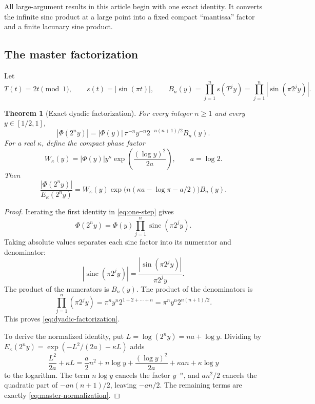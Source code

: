 \documentclass[11pt,oneside]{article}
\numberwithin{equation}{section}
\newtheorem{theorem}{Theorem}[section]
\theoremstyle{definition}
\theoremstyle{remark}
\newcommand{\abs}[1]{\left|#1\right|}
\newcommand{\sinc}{\operatorname{sinc}}
\newcommand{\PhiUp}{\Phi}
\begin{document}
All large-argument results in this article begin with one exact identity.  It converts the
infinite sinc product at a large point into a fixed compact ``mantissa'' factor and a finite
lacunary sine product.

\subsection{The master factorization}

Let
\begin{equation}
 T(t)=2t\pmod1,
 \qquad s(t)=\abs{\sin(\pi t)},
 \qquad
 B_n(y)=\prod_{j=1}^{n}s(T^jy)
       =\prod_{j=1}^{n}\abs{\sin(\pi2^jy)}.
 \label{eq:T-s-B}
\end{equation}

\begin{theorem}[Exact dyadic factorization]
\label{thm:dyadic-factorization}
For every integer \(n\ge1\) and every \(y\in[1/2,1]\),
\begin{equation}
 \boxed{
 \abs{\PhiUp(2^ny)}
 =\abs{\PhiUp(y)}\,\pi^{-n}y^{-n}2^{-n(n+1)/2}B_n(y).}
 \label{eq:dyadic-factorization}
\end{equation}
For a real \(\kappa\), define the compact phase factor
\begin{equation}
 W_\kappa(y)
 =\abs{\PhiUp(y)}y^\kappa
   \exp\!\left(\frac{(\log y)^2}{2a}\right),
 \qquad a=\log2.
 \label{eq:W-kappa}
\end{equation}
Then
\begin{equation}
 \boxed{
 \frac{\abs{\PhiUp(2^ny)}}{E_\kappa(2^ny)}
 =W_\kappa(y)
   \exp\!\bigl(n(\kappa a-\log\pi-a/2)\bigr)B_n(y).}
 \label{eq:master-normalization}
\end{equation}
\end{theorem}

\begin{proof}
Iterating the first identity in \eqref{eq:one-step} gives
\[
 \PhiUp(2^ny)=\PhiUp(y)\prod_{j=1}^{n}\sinc(\pi2^jy).
\]
Taking absolute values separates each sinc factor into its numerator and denominator:
\[
 \left|\sinc(\pi2^jy)\right|
 =\frac{\abs{\sin(\pi2^jy)}}{\pi2^jy}.
\]
The product of the numerators is \(B_n(y)\).  The product of the denominators is
\[
 \prod_{j=1}^{n}(\pi2^jy)
 =\pi^ny^n2^{1+2+\cdots+n}
 =\pi^ny^n2^{n(n+1)/2}.
\]
This proves \eqref{eq:dyadic-factorization}.

To derive the normalized identity, put \(L=\log(2^ny)=na+\log y\).  Dividing by
\(E_\kappa(2^ny)=\exp(-L^2/(2a)-\kappa L)\) adds
\[
 \frac{L^2}{2a}+\kappa L
 =\frac{a}{2}n^2+n\log y+\frac{(\log y)^2}{2a}
   +\kappa an+\kappa\log y
\]
to the logarithm.  The term \(n\log y\) cancels the factor \(y^{-n}\), and
\(an^2/2\) cancels the quadratic part of \(-a n(n+1)/2\), leaving \(-an/2\).
The remaining terms are exactly \eqref{eq:master-normalization}.
\end{proof}
\end{document}
